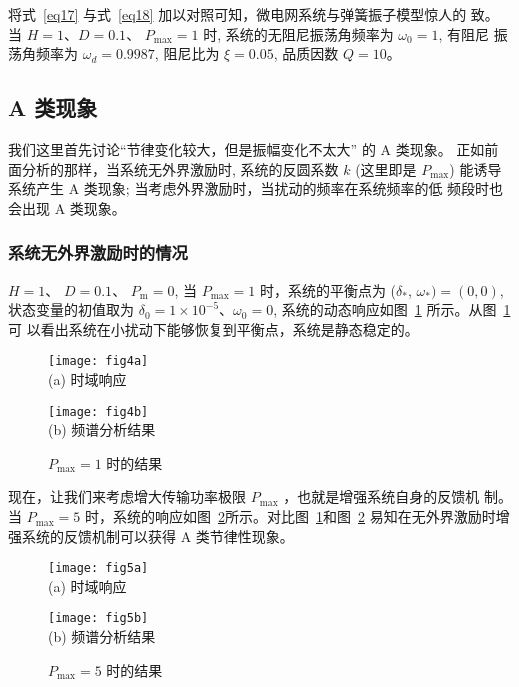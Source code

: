 \documentclass[withoutpreface,bwprint]{cumcmthesis} %
\begin{document}
将式~\eqref{eq17} 与式~\eqref{eq18} 加以对照可知，微电网系统与弹簧振子模型惊人的 致。当 $ H=1 $、$ D=0.1 $、 $P_{\max}=1 $ 时, 系统的无阻尼振荡角频率为  $\omega_{0}=1 $, 有阻尼 振荡角频率为 $ \omega_{d}=0.9987 $, 阻尼比为 $ \xi=0.05 $, 品质因数 $ Q=10  $。

\subsection{A 类现象}
\label{sec5-2}

我们这里首先讨论“节律变化较大，但是振幅变化不太大” 的 A 类现象。 正如前面分析的那样，当系统无外界激励时, 系统的反圆系数  $k$ (这里即是 $P_{\max }$)  能诱导系统产生 A 类现象; 当考虑外界激励时，当扰动的频率在系统频率的低 频段时也会出现 A 类现象。

\subsubsection{系统无外界激励时的情况}
\label{sec5-2-1}

$H=1$、 $D=0.1$、 $P_{\mathrm{m}}=0 $, 当 $ P_{\max }=1 $ 时，系统的平衡点为 ($\delta_{*}$, $\omega_{*})=(0,0)$, 状态变量的初值取为 $ \delta_{0}=1 \times 10^{-5} $、$ \omega_{0}=0 $, 系统的动态响应如图~\ref{fig4} 所示。从图~\ref{fig4} 可
以看出系统在小扰动下能够恢复到平衡点，系统是静态稳定的。

\begin{figure}[h!t]
\begin{minipage}{0.48\linewidth}
  \centering
  {
  \texttt{[image: fig4a]}\\
  (a) 时域响应
  }
\end{minipage}\hfill
\begin{minipage}{0.48\linewidth}
  \centering
  {
  \texttt{[image: fig4b]}\\
  (b) 频谱分析结果
  }
\end{minipage}
    \caption{$P_{\max}=1$ 时的结果}
    \label{fig4}
    \end{figure}

    现在，让我们来考虑增大传输功率极限 $P_{\max}$ ，也就是增强系统自身的反馈机
    制。当 $P_{\max}=5$  时，系统的响应如图~\ref{fig5}所示。对比图~\ref{fig4}和图~\ref{fig5} 易知在无外界激励时增强系统的反馈机制可以获得 A 类节律性现象。

\begin{figure}[h!t]
\begin{minipage}{0.48\linewidth}
  \centering
  {
  \texttt{[image: fig5a]}\\
  (a) 时域响应
  }
\end{minipage}\hfill
\begin{minipage}{0.48\linewidth}
  \centering
  {
  \texttt{[image: fig5b]}\\
  (b) 频谱分析结果
  }
\end{minipage}
    \caption{$P_{\max}=5$ 时的结果}
    \label{fig5}
    \end{figure}
\end{document}

